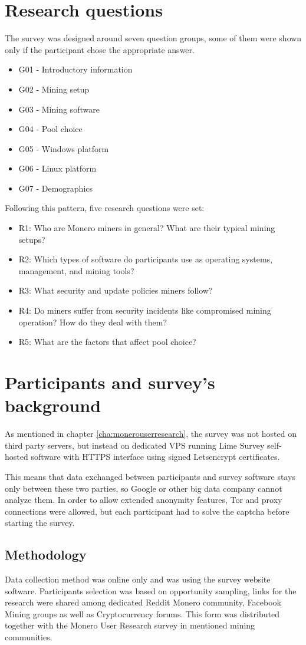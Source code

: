 \documentclass[
  printed, %
  table,   %
  nolof,     %
  nolot,     %
           oneside, color
]{fithesis3}
\begin{document}
\section{Research questions}
The survey was designed around seven question groups, some of them were shown only if the participant chose the appropriate answer.
\begin{itemize}\itemsep0em
\item G01 - Introductory information
\item G02 - Mining setup
\item G03 - Mining software
\item G04 - Pool choice
\item G05 - Windows platform
\item G06 - Linux platform
\item G07 - Demographics
\end{itemize}
Following this pattern, five research questions were set:
\begin{itemize}\itemsep0em
\item R1: Who are Monero miners in general? What are their typical mining setups? 
\item R2: Which types of software do participants use as operating systems, management, and mining tools?
\item R3: What security and update policies miners follow? 
\item R4: Do miners suffer from security incidents like compromised mining operation? How do they deal with them?
\item R5: What are the factors that affect pool choice?
\end{itemize}
\section{Participants and survey's background}
As mentioned in chapter \ref{cha:monerouserresearch}, the survey was not hosted on third party servers, but instead on dedicated VPS running Lime Survey self-hosted software with HTTPS interface using signed Letsencrypt certificates.

This means that data exchanged between participants and survey software stays only between these two parties, so Google or other big data company cannot analyze them. In order to allow extended anonymity features, Tor and proxy connections were allowed, but each participant had to solve the captcha before starting the survey.
\subsection{Methodology}
Data collection method was online only and was using the survey website software. Participants selection was based on opportunity sampling, links for the research were shared among dedicated Reddit Monero community, Facebook Mining groups as well as Cryptocurrency forums. This form was distributed together with the Monero User Research survey in mentioned mining communities.
\end{document}
